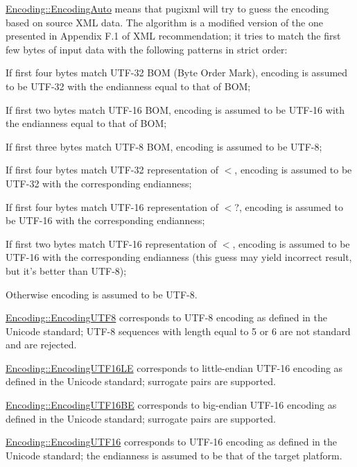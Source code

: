 \begin{DoxyItemize}
\item \hyperlink{namespacephys_1_1xml_a420f5de782438f88160321385bea2015}{Encoding::EncodingAuto} means that pugixml will try to guess the encoding based on source XML data. The algorithm is a modified version of the one presented in Appendix F.1 of XML recommendation; it tries to match the first few bytes of input data with the following patterns in strict order:
\begin{DoxyItemize}
\item If first four bytes match UTF-\/32 BOM (Byte Order Mark), encoding is assumed to be UTF-\/32 with the endianness equal to that of BOM;
\item If first two bytes match UTF-\/16 BOM, encoding is assumed to be UTF-\/16 with the endianness equal to that of BOM;
\item If first three bytes match UTF-\/8 BOM, encoding is assumed to be UTF-\/8;
\item If first four bytes match UTF-\/32 representation of $<$, encoding is assumed to be UTF-\/32 with the corresponding endianness;
\item If first four bytes match UTF-\/16 representation of $<$?, encoding is assumed to be UTF-\/16 with the corresponding endianness;
\item If first two bytes match UTF-\/16 representation of $<$, encoding is assumed to be UTF-\/16 with the corresponding endianness (this guess may yield incorrect result, but it's better than UTF-\/8);
\item Otherwise encoding is assumed to be UTF-\/8.
\end{DoxyItemize}
\item \hyperlink{namespacephys_1_1xml_a420f5de782438f88160321385bea2015}{Encoding::EncodingUTF8} corresponds to UTF-\/8 encoding as defined in the Unicode standard; UTF-\/8 sequences with length equal to 5 or 6 are not standard and are rejected.
\item \hyperlink{namespacephys_1_1xml_a420f5de782438f88160321385bea2015}{Encoding::EncodingUTF16LE} corresponds to little-\/endian UTF-\/16 encoding as defined in the Unicode standard; surrogate pairs are supported.
\item \hyperlink{namespacephys_1_1xml_a420f5de782438f88160321385bea2015}{Encoding::EncodingUTF16BE} corresponds to big-\/endian UTF-\/16 encoding as defined in the Unicode standard; surrogate pairs are supported.
\item \hyperlink{namespacephys_1_1xml_a420f5de782438f88160321385bea2015}{Encoding::EncodingUTF16} corresponds to UTF-\/16 encoding as defined in the Unicode standard; the endianness is assumed to be that of the target platform.

\end{DoxyItemize}
